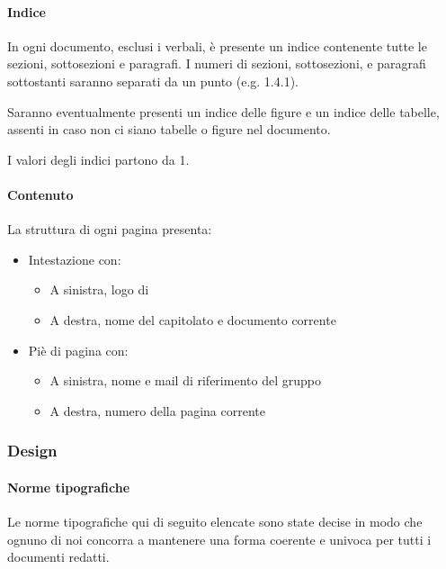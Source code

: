 			\paragraph{Indice}\label{PS:Documentazione:Struttura:Indice}
			In ogni documento, esclusi i verbali, è presente un indice contenente tutte le sezioni, sottosezioni e paragrafi. I numeri di sezioni, sottosezioni,
			e paragrafi sottostanti saranno separati da un punto (e.g. 1.4.1).\par
			Saranno eventualmente presenti un indice delle
			figure e un indice delle tabelle, assenti in caso non ci siano tabelle o figure nel documento.\par
			I valori degli indici partono da 1.

			\paragraph{Contenuto}\label{PS:Documentazione:Struttura:Contenuto}
			La struttura di ogni pagina presenta:
			\begin{itemize}
				\item Intestazione con:
				\begin{itemize}
					\item A sinistra, logo di \gruppo
					\item A destra, nome del capitolato e documento corrente
				\end{itemize}
				\item Piè di pagina con:
				\begin{itemize}
					\item A sinistra, nome e mail di riferimento del gruppo
					\item A destra, numero della pagina corrente
				\end{itemize}
			\end{itemize}


		\subsubsection{Design}\label{PS:Documentazione:Design}

			\paragraph{Norme tipografiche}\label{PS:Documentazione:Design:NormeT}
			Le norme tipografiche qui di seguito elencate sono state decise in modo che ognuno di noi concorra a mantenere una forma coerente e univoca
			per tutti i documenti redatti.
			
